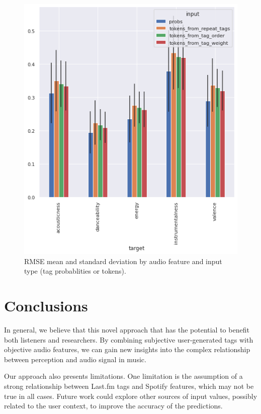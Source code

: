 \documentclass[sn-mathphys]{sn-jnl}%
\theoremstyle{thmstyleone}%
\theoremstyle{thmstyletwo}%
\theoremstyle{thmstylethree}%
\begin{document}
\begin{figure}[h!]
      \centering
      \includegraphics[width=1\textwidth]{images/rmse_by_feature_and_input.png}
      \caption{RMSE mean and standard deviation by audio feature and input type (tag probablities or tokens).}
      \label{fig:rmse_by_feature_and_input}
\end{figure}

\section{Conclusions}\label{sec6}

In general, we believe that this novel approach that has the potential to benefit both listeners and researchers.
By combining subjective user-generated tags with objective audio features,
we can gain new insights into the complex relationship between perception and audio signal in music.

Our approach also presents limitations.
One limitation is the assumption of a strong relationship between Last.fm tags and Spotify features, which may not be true in all cases.
Future work could explore other sources of input values, possibly related to the user context, to improve the accuracy of the predictions.
\end{document}
